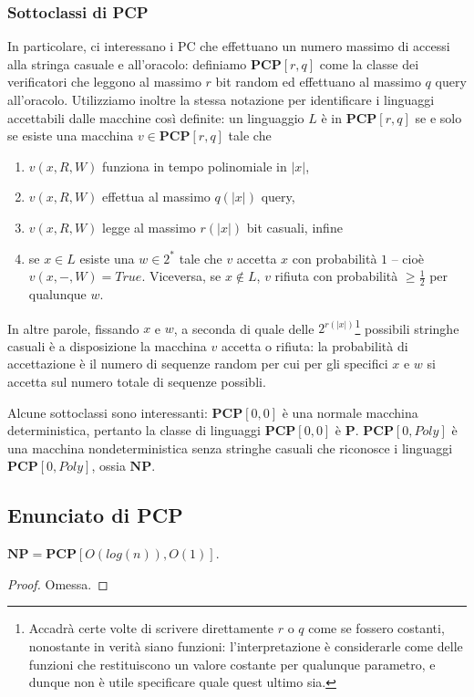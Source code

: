 \subsubsection{Sottoclassi di PCP}
In particolare, ci interessano i PC che effettuano un numero massimo di
accessi alla stringa casuale e all'oracolo: definiamo
$\mathbf{PCP}[r,q]$ come la classe dei verificatori che leggono al massimo $r$ bit random
ed effettuano al massimo $q$ query all'oracolo. Utilizziamo inoltre la stessa
notazione per identificare i linguaggi accettabili dalle macchine così definite:
un linguaggio $L$ è  in $\mathbf{PCP}[r,q]$ se e solo se esiste una macchina
$v \in \mathbf{PCP}[r,q]$ tale che
\begin{enumerate}
	\item $v(x,R,W)$ funziona in tempo polinomiale in $|x|$,
	\item $v(x,R,W)$ effettua al massimo $q(|x|)$ query,
	\item $v(x,R,W)$ legge al massimo $r(|x|)$ bit casuali, infine
	\item se $x \in L$ esiste una $w \in 2^*$ tale che $v$ accetta $x$ con probabilità
	      $1$ -- cioè $v(x, -, W) = True$. Viceversa, se $x \notin L$, $v$ rifiuta
	      con probabilità $\geq \frac{1}{2}$ per qualunque $w$.
\end{enumerate}
In altre parole, fissando $x$ e $w$, a seconda di quale delle $2^{r(|x|)}$\footnote{
	Accadrà certe volte di scrivere direttamente $r$ o $q$ come se fossero
	costanti, nonostante in verità siano funzioni: l'interpretazione è
	considerarle come delle funzioni che restituiscono un valore costante
	per qualunque parametro, e dunque non è utile specificare quale quest
	ultimo sia.
}
possibili stringhe casuali è a disposizione la macchina $v$ accetta o rifiuta:
la probabilità di accettazione è il numero di sequenze random per cui per gli specifici
$x$ e $w$ si accetta sul numero totale di sequenze possibli.

Alcune sottoclassi sono interessanti: $\mathbf{PCP}[0,0]$ è una normale macchina deterministica,
pertanto la classe di linguaggi $\textbf{PCP}[0,0]$ è $\textbf{P}$.
$\textbf{PCP}[0, Poly]$ è una macchina nondeterministica senza stringhe casuali che riconosce
i linguaggi $\textbf{PCP}[0, Poly]$, ossia $\textbf{NP}$.

\subsection{Enunciato di PCP}
\begin{theorem}\label{thm:pcp}
	$\textbf{NP} = \textbf{PCP}[O(log(n)), O(1)]$.
\end{theorem}
\begin{proof}
	Omessa.
\end{proof}

